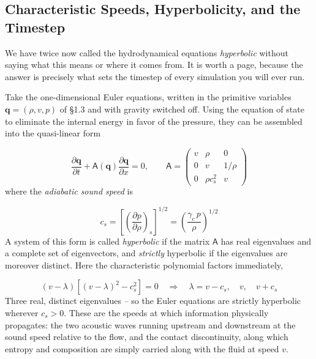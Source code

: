 \documentclass[notoc]{tufte-handout}
\renewcommand{\vec}[1]{\mathbf{#1}}
\begin{document}
\subsection{Characteristic Speeds, Hyperbolicity, and the Timestep}

We have twice now called the hydrodynamical equations {\it hyperbolic} without saying what this means or where it comes from. It is worth a page, because the answer is precisely what sets the timestep of every simulation you will ever run.

Take the one-dimensional Euler equations, written in the primitive variables $\vec{q} = (\rho, v, p)$ of \S 1.3 and with gravity switched off. Using the equation of state to eliminate the internal energy in favor of the pressure, they can be assembled into the quasi-linear form

\begin{equation}
\frac{\partial \vec{q}}{\partial t} + \mathsf{A}(\vec{q}) \frac{\partial \vec{q}}{\partial x} = 0, \qquad
\mathsf{A} = \begin{pmatrix}
v & \rho & 0 \\
0 & v & 1/\rho \\
0 & \rho c_s^2 & v
\end{pmatrix}
\end{equation}
%
where the {\it adiabatic sound speed} is

\begin{equation}
c_s = \left[ \left( \frac{\partial p}{\partial \rho} \right)_{\! s} \right]^{1/2} = \left( \frac{\gamma_c \, p}{\rho} \right)^{1/2}
\end{equation}
%
A system of this form is called {\it hyperbolic} if the matrix $\mathsf{A}$ has real eigenvalues and a complete set of eigenvectors, and {\it strictly} hyperbolic if the eigenvalues are moreover distinct. Here the characteristic polynomial factors immediately,

\begin{equation}
(v - \lambda)\left[ (v-\lambda)^2 - c_s^2 \right] = 0 \quad \Longrightarrow \quad \lambda = v - c_s, \quad v, \quad v + c_s
\end{equation}
%
Three real, distinct eigenvalues -- so the Euler equations are strictly hyperbolic wherever $c_s > 0$. These are the speeds at which information physically propagates: the two acoustic waves running upstream and downstream at the sound speed relative to the flow, and the contact discontinuity, along which entropy and composition are simply carried along with the fluid at speed $v$. 
\end{document}
